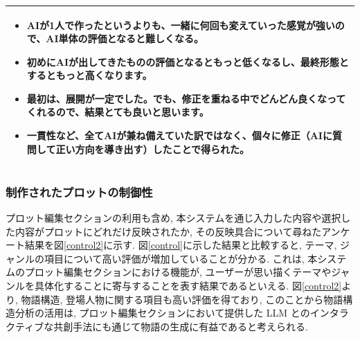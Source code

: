\documentclass[a4j,12pt]{jsreport}
\begin{document}
\setlongtables
\begin{tabularx}{12cm}{X}
   \caption{インタラクティブ性について記述されたアンケート結果の抜粋}
   \label{tab:interaction}
   \vspace{-3pt}
   \endfirsthead
   \hline
   \vspace{0.2cm}
   \begin{minipage}{\linewidth}
      \vspace{0.1cm}
               \begin{itemize}[itemsep=0pt, parsep=2pt]
                  \item AIが1人で作ったというよりも、一緒に何回も変えていった感覚が強いので、AI単体の評価となると難しくなる。
                  \item 初めにAIが出してきたものの評価となるともっと低くなるし、最終形態とするともっと高くなります。
                  \item 最初は、展開が一定でした。でも、修正を重ねる中でどんどん良くなってくれるので、結果とても良いと思います。
                  \item 一貫性など、全てAIが兼ね備えていた訳ではなく、個々に修正（AIに質問して正い方向を導き出す）したことで得られた。
               \end{itemize}
   \end{minipage} \\
   \hline
\end{tabularx}

\subsubsection{制作されたプロットの制御性}
プロット編集セクションの利用も含め, 本システムを通じ入力した内容や選択した内容がプロットにどれだけ反映されたか, その反映具合について尋ねたアンケート結果を図\ref{control2}に示す. 図\ref{control}に示した結果と比較すると, テーマ, ジャンルの項目について高い評価が増加していることが分かる. これは, 本システムのプロット編集セクションにおける機能が, ユーザーが思い描くテーマやジャンルを具体化することに寄与することを表す結果であるといえる. 図\ref{control2}より, 物語構造, 登場人物に関する項目も高い評価を得ており, このことから物語構造分析の活用は, プロット編集セクションにおいて提供した LLM とのインタラクティブな共創手法にも通じて物語の生成に有益であると考えられる.

\end{document}
